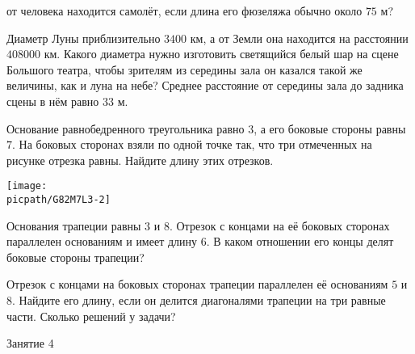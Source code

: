 \begin{class}[number=3]
\begin{listofex}
		от человека находится самолёт, если длина его фюзеляжа обычно около \( 75 \) м?
		\item Диаметр Луны приблизительно \( 3400 \) км, а от Земли она находится на расстоянии	\( 408000 \) км. Какого диаметра нужно изготовить светящийся белый шар на сцене Большого театра, чтобы зрителям из середины зала он казался такой же величины, как и луна на небе? Среднее расстояние от середины зала до задника сцены в нём равно \( 33 \) м.
		\item Основание равнобедренного треугольника равно \( 3 \), а его боковые стороны равны \( 7 \). На боковых сторонах взяли по одной точке так, что три отмеченных на рисунке отрезка равны. Найдите длину этих отрезков.
		\begin{center}
			\texttt{[image: \\picpath/G82M7L3-2]}
		\end{center}
		\item Основания трапеции равны \( 3 \) и \( 8 \). Отрезок с концами на её боковых сторонах параллелен основаниям и имеет длину \( 6 \). В каком отношении его концы делят боковые стороны трапеции?
		\item Отрезок с концами на боковых сторонах	трапеции параллелен её основаниям \( 5 \) и \( 8 \). Найдите его длину, если он делится диагоналями трапеции на три равные части. Сколько решений у задачи?
	\end{listofex}
\end{class}

\begin{class}[number=4]
	\begin{listofex}
		\item Занятие 4
	\end{listofex}
\end{class}

